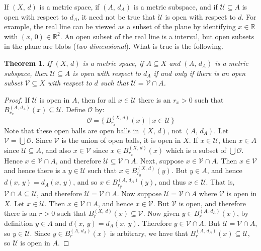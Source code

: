 \documentclass{article}
\theoremstyle{plain}
\newtheorem{theorem}{Theorem}[section]
\theoremstyle{normal}
\begin{document}
        If $(X,\,d)$ is a metric space, if $(A,\,d_{A})$ is a metric subspace,
        and if $\mathcal{U}\subseteq{A}$ is open with respect to $d_{A}$, it
        need not be true that $\mathcal{U}$ is open with respect to $d$.
        For example, the real line can be viewed as a subset of the plane
        by identifying $x\in\mathbb{R}$ with $(x,\,0)\in\mathbb{R}^{2}$. An
        open subset of the real line is a interval, but open subsets in the
        plane are blobs (\textit{two dimensional}). What is true is the
        following.
        \begin{theorem}
            If $(X,\,d)$ is a metric space, if $A\subseteq{X}$ and
            $(A,\,d_{A})$ is a metric subspace, then
            $\mathcal{U}\subseteq{A}$ is open with respect to $d_{A}$ if and
            only if there is an open subset $\mathcal{V}\subseteq{X}$ with
            respect to $d$ such that
            $\mathcal{U}=\mathcal{V}\cap{A}$.
        \end{theorem}
        \begin{proof}
            If $\mathcal{U}$ is open in $A$, then for all
            $x\in\mathcal{U}$ there is an $r_{x}>0$ such that
            $B_{r_{x}}^{(A,\,d_{A})}(x)\subseteq\mathcal{U}$. Define
            $\mathcal{O}$ by:
            \begin{equation}
                \mathcal{O}=\{\,B_{r_{x}}^{(X,\,d)}(x)\;|\;x\in\mathcal{U}\,\}
            \end{equation}
            Note that these open balls are open balls in $(X,\,d)$, not
            $(A,\,d_{A})$. Let $\mathcal{V}=\bigcup\mathcal{O}$. Since
            $\mathcal{V}$ is the union of open balls, it is open in $X$.
            If $x\in\mathcal{U}$, then $x\in{A}$ since
            $\mathcal{U}\subseteq{A}$, and also
            $x\in\mathcal{V}$ since $x\in{B}_{r_{x}}^{(X,\,d)}(x)$ which is
            a subset of $\bigcup\mathcal{O}$. Hence
            $x\in\mathcal{V}\cap{A}$, and therefore
            $\mathcal{U}\subseteq\mathcal{V}\cap{A}$. Next, suppose
            $x\in\mathcal{V}\cap{A}$. Then $x\in\mathcal{V}$ and hence there
            is a $y\in\mathcal{U}$ such that
            $x\in{B}_{r_{y}}^{(X,\,d)}(y)$. But $y\in{A}$, and hence
            $d(x,\,y)=d_{A}(x,\,y)$, and so
            $x\in{B}_{r_{y}}^{(A,\,d_{A})}(y)$, and thus
            $x\in\mathcal{U}$. That is,
            $\mathcal{V}\cap{A}\subseteq\mathcal{U}$, and therefore
            $\mathcal{U}=\mathcal{V}\cap{A}$. Now suppose
            $\mathcal{U}=\mathcal{V}\cap{A}$ where $\mathcal{V}$ is open in
            $X$. Let $x\in\mathcal{U}$. Then $x\in\mathcal{V}\cap{A}$, and
            hence $x\in\mathcal{V}$. But $\mathcal{V}$ is open, and therefore
            there is an $r>0$ such that
            $B_{r}^{(X,\,d)}(x)\subseteq\mathcal{V}$. Now given
            $y\in{B}_{r}^{(A,\,d_{A})}(x)$, by definition $y\in{A}$ and
            $d(x,\,y)=d_{A}(x,\,y)$. Therefore
            $y\in\mathcal{V}\cap{A}$. But $\mathcal{U}=\mathcal{V}\cap{A}$,
            so $y\in\mathcal{U}$. Since $y\in{B}_{r}^{(A,\,d_{A})}(x)$ is
            arbitrary, we have that
            $B_{r}^{(A,\,d_{A})}(x)\subseteq\mathcal{U}$, so
            $\mathcal{U}$ is open in $A$.
        \end{proof}
\end{document}
